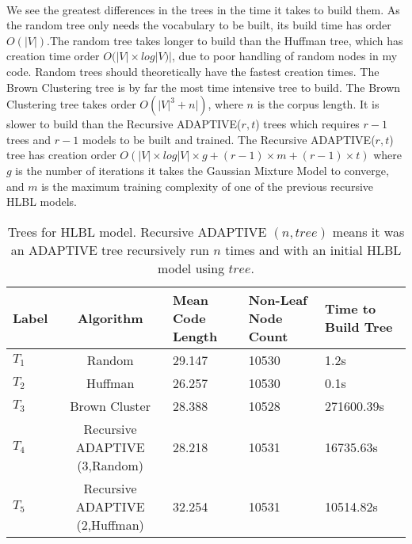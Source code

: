 \documentclass[12pt]{ociamthesis}  %
\newcommand{\ra}[1]{\renewcommand{\arraystretch}{#1}}
\begin{document}
\paragraph{}
We see the greatest differences in the trees in the time it takes to build them. As the random tree only needs the vocabulary to be built, its build time has order $O(|V|)$.The random tree takes longer to build than the Huffman tree, which has creation time order $O(|V|\times log|V)|$, due to poor handling of random nodes in my code. Random trees should theoretically have the fastest creation times. The Brown Clustering tree is by far the most time intensive tree to build. The Brown Clustering tree takes order $O(|V|^3+n|)$, where $n$ is the corpus length. It is slower to build than the Recursive ADAPTIVE($r,t$) trees which requires $r-1$ trees and $r-1$ models to be built and trained. The Recursive ADAPTIVE($r,t$) tree has creation order $O ( |V| \times log|V| \times g + (r-1)\times m + (r-1)\times t)$ where $g$ is the number of iterations it takes the Gaussian Mixture Model to converge, and $m$ is the maximum training complexity of one of the previous recursive HLBL models.

\begin{table*} \centering
\ra{1.3}
\begin{tabular}{@{}C{1.5cm} c C{1.5cm} C{2cm} C{2cm}@{}}\toprule 
Label & Algorithm & Mean Code Length & Non-Leaf Node Count  & Time to Build Tree\\ 
\midrule
$T_1$ & Random & 29.147 & 10530 & 1.2s\\
$T_2$ & Huffman & 26.257 & 10530 & 0.1s\\
$T_3$ & Brown Cluster & 28.388 & 10528 &271600.39s \\
$T_4$ & Recursive ADAPTIVE (3,Random)& 28.218 & 10531 &16735.63s \\
$T_5$ & Recursive ADAPTIVE (2,Huffman)& 32.254 & 10531 &10514.82s\\
\bottomrule
\end{tabular}
\caption{Trees for HLBL model. Recursive ADAPTIVE $(n,tree)$ means it was an ADAPTIVE tree recursively run $n$ times and with an initial HLBL model using $tree$.}
\label{tab:trees}
\end{table*}
\end{document}
